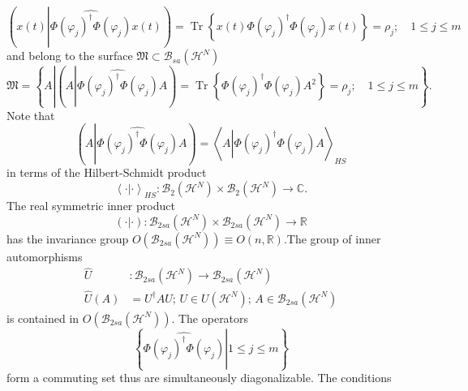 \documentclass[aps,preprint]{revtex4}%
\begin{document}
\begin{equation}
\left(  x\left(  t\right)  \left\vert \widehat{\Phi\left(  \varphi_{j}\right)
^{\dagger}\Phi\left(  \varphi_{j}\right)  }x\left(  t\right)  \right.
\right)  =\operatorname{Tr}\left\{  x\left(  t\right)  \Phi\left(  \varphi
_{j}\right)  ^{\dagger}\Phi\left(  \varphi_{j}\right)  x\left(  t\right)
\right\}  =\rho_{j};\quad1\leq j\leq m
\end{equation}
and belong to the surface $\mathfrak{M\subset}\mathcal{B}_{sa}\left(
\mathcal{H}^{N}\right)  $
\begin{equation}
\mathfrak{M}=\left\{  A\left\vert \left(  A\left\vert \widehat{\Phi\left(
\varphi_{j}\right)  ^{\dagger}\Phi\left(  \varphi_{j}\right)  }A\right.
\right)  =\operatorname{Tr}\left\{  \Phi\left(  \varphi_{j}\right)  ^{\dagger
}\Phi\left(  \varphi_{j}\right)  A^{2}\right\}  =\rho_{j};\quad1\leq j\leq
m\right.  \right\}  .
\end{equation}
Note that
\begin{equation}
\left(  A\left\vert \widehat{\Phi\left(  \varphi_{j}\right)  ^{\dagger}%
\Phi\left(  \varphi_{j}\right)  }A\right.  \right)  =\left\langle A\left\vert
\Phi\left(  \varphi_{j}\right)  ^{\dagger}\Phi\left(  \varphi_{j}\right)
A\right.  \right\rangle _{HS}%
\end{equation}
in terms of the Hilbert-Schmidt product
\begin{equation}
\left\langle \cdot\left\vert \cdot\right.  \right\rangle _{HS}:\mathcal{B}%
_{2}\left(  \mathcal{H}^{N}\right)  \times\mathcal{B}_{2}\left(
\mathcal{H}^{N}\right)  \rightarrow\mathbb{C}.
\end{equation}
The real symmetric inner product
\begin{equation}
\left(  \cdot\left\vert \cdot\right.  \right)  :\mathcal{B}_{2sa}\left(
\mathcal{H}^{N}\right)  \times\mathcal{B}_{2sa}\left(  \mathcal{H}^{N}\right)
\rightarrow\mathbb{R}%
\end{equation}
has the invariance group $O\left(  \mathcal{B}_{2sa}\left(  \mathcal{H}%
^{N}\right)  \right)  \equiv O\left(  n,\mathbb{R}\right)  .$The group of
inner automorphisms%
\begin{align}
\widehat{U}  &  :\mathcal{B}_{2sa}\left(  \mathcal{H}^{N}\right)
\rightarrow\mathcal{B}_{2sa}\left(  \mathcal{H}^{N}\right) \\
\widehat{U}\left(  A\right)   &  =U^{\dagger}AU;\,U\in U\left(  \mathcal{H}%
^{N}\right)  ;\,A\in\mathcal{B}_{2sa}\left(  \mathcal{H}^{N}\right)
\end{align}
is contained in $O\left(  \mathcal{B}_{2sa}\left(  \mathcal{H}^{N}\right)
\right)  .$ The operators
\begin{equation}
\left\{  \left.  \widehat{\Phi\left(  \varphi_{j}\right)  ^{\dagger}%
\Phi\left(  \varphi_{j}\right)  }\right\vert 1\leq j\leq m\right\}
\end{equation}
form a commuting set thus are simultaneously diagonalizable. The conditions
\end{document}
